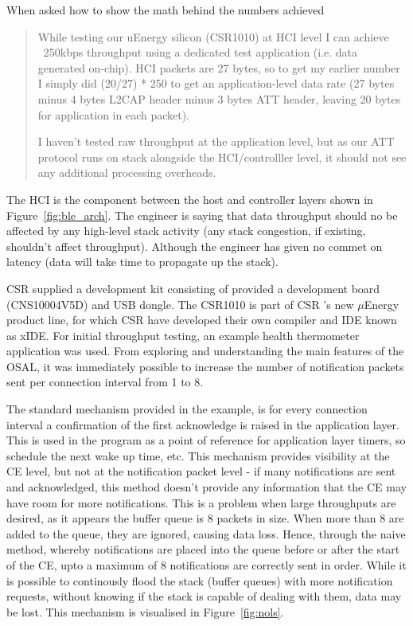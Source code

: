 \documentclass[]{article}
\begin{document}
When asked how to show the math behind the numbers achieved

\begin{quote}\itshape

While testing our uEnergy silicon (CSR1010) at HCI level I can achieve 
~250kbps throughput using a dedicated test application (i.e. data 
generated on-chip). HCI packets are 27 bytes, so to get my earlier 
number I simply did (20/27) * 250 to get an application-level data rate 
(27 bytes minus 4 bytes L2CAP header minus 3 bytes ATT header, leaving 
20 bytes for application in each packet).

I haven't tested raw throughput at the application level, but as our ATT 
protocol runs on stack alongside the HCI/controlller level, it should 
not see any additional processing overheads. \text{ \textnormal{[sic]}}

\end{quote}

The \ac{HCI} is the component between the host and controller layers shown in Figure~\ref{fig:ble_arch}. The engineer is saying that data throughput should no be affected by any high-level stack activity (any stack congestion, if existing, shouldn't affect throughput). Although the engineer has given no commet on latency (data will take time to propagate up the stack).

 \ac{CSR} supplied a development kit consisting of  provided a development board (CNS10004V5D) and \ac{USB} dongle. The CSR1010 is part of \ac{CSR} 's new $\mu$Energy product line, for which \ac{CSR} have developed their own compiler and \ac{IDE} known as xIDE. For initial throughput testing, an example health thermometer application was used. From exploring and understanding the main features of the \ac{OSAL}, it was immediately possible to increase the number of notification packets sent per connection interval from 1 to 8. 

The standard mechanism provided in the example, is for every connection interval a confirmation of the first acknowledge is raised in the application layer. This is used in the program as a point of reference for application layer timers, so schedule the next wake up time, etc.  This mechanism provides visibility at the \ac{CE} level, but not at the notification packet level - if many notifications are sent and acknowledged, this method doesn't provide any information that the \ac{CE} may have room for more notifications. This is a problem when large throughputs are desired, as it appears the buffer queue is 8 packets in size. When more than 8 are added to the queue, they are ignored, causing data loss. Hence, through the naive method, whereby notifications are placed into the queue before or after the start of the \ac{CE}, upto a maximum of 8 notifications are correctly sent in order. While it is possible to continously flood the stack (buffer queues) with more notification requests, without knowing if the stack is capable of dealing with them, data may be lost. This mechanism is visualised in Figure~\ref{fig:nols}. 
\end{document}
